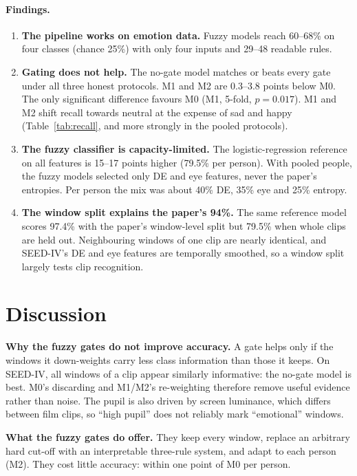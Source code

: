 \documentclass[10pt,a4paper]{article}
\begin{document}
\paragraph{Findings.}
\begin{enumerate}
  \item \textbf{The pipeline works on emotion data.} Fuzzy models reach 60--68\% on four classes (chance 25\%) with only four inputs and 29--48 readable rules.
  \item \textbf{Gating does not help.} The no-gate model matches or beats every gate under all three honest protocols. M1 and M2 are 0.3--3.8 points below M0. The only significant difference favours M0 (M1, 5-fold, $p{=}0.017$). M1 and M2 shift recall towards neutral at the expense of sad and happy (Table~\ref{tab:recall}, and more strongly in the pooled protocols).
  \item \textbf{The fuzzy classifier is capacity-limited.} The logistic-regression reference on all features is 15--17 points higher (79.5\% per person). With pooled people, the fuzzy models selected only DE and eye features, never the paper's entropies. Per person the mix was about 40\% DE, 35\% eye and 25\% entropy.
  \item \textbf{The window split explains the paper's 94\%.} The same reference model scores 97.4\% with the paper's window-level split but 79.5\% when whole clips are held out. Neighbouring windows of one clip are nearly identical, and SEED-IV's DE and eye features are temporally smoothed, so a window split largely tests clip recognition.
\end{enumerate}

\section{Discussion}
\textbf{Why the fuzzy gates do not improve accuracy.} A gate helps only if the windows it down-weights carry less class information than those it keeps. On SEED-IV, all windows of a clip appear similarly informative: the no-gate model is best. M0's discarding and M1/M2's re-weighting therefore remove useful evidence rather than noise. The pupil is also driven by screen luminance, which differs between film clips, so ``high pupil'' does not reliably mark ``emotional'' windows.

\textbf{What the fuzzy gates do offer.} They keep every window, replace an arbitrary hard cut-off with an interpretable three-rule system, and adapt to each person (M2). They cost little accuracy: within one point of M0 per person.
\end{document}
